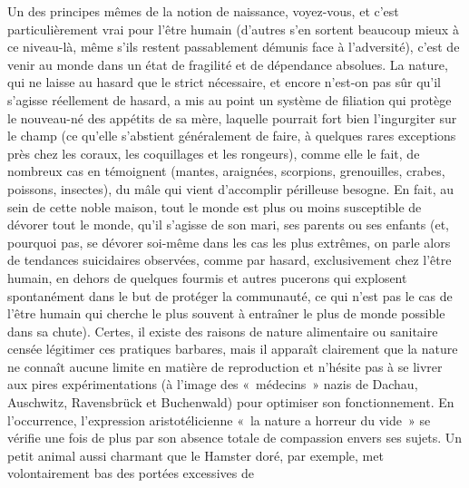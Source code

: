 Un des principes mêmes de la notion de naissance, voyez-vous, et c’est particulièrement vrai pour l’être humain (d’autres s’en sortent beaucoup mieux à ce niveau-là, même s’ils restent passablement démunis face à l’adversité), c’est de venir au monde dans un état de fragilité et de dépendance absolues. La nature, qui ne laisse au hasard que le strict nécessaire, et encore n’est-on pas sûr qu’il s’agisse réellement de hasard, a mis au point un système de filiation qui protège le nouveau-né des appétits de sa mère, laquelle pourrait fort bien l’ingurgiter sur le champ (ce qu’elle s’abstient généralement de faire, à quelques rares exceptions près chez les coraux, les coquillages et les rongeurs), comme elle le fait, de nombreux cas en témoignent (mantes, araignées, scorpions, grenouilles, crabes, poissons, insectes), du mâle qui vient d’accomplir périlleuse besogne. En fait, au sein de cette noble maison, tout le monde est plus ou moins susceptible de dévorer tout le monde, qu’il s’agisse de son mari, ses parents ou ses enfants (et, pourquoi pas, se dévorer soi-même dans les cas les plus extrêmes, on parle alors de tendances suicidaires observées, comme par hasard, exclusivement chez l’être humain, en dehors de quelques fourmis et autres pucerons qui explosent spontanément dans le but de protéger la communauté, ce qui n’est pas le cas de l’être humain qui cherche le plus souvent à entraîner le plus de monde possible dans sa chute). Certes, il existe des raisons de nature alimentaire ou sanitaire censée légitimer ces pratiques barbares, mais il apparaît clairement que la nature ne connaît aucune limite en matière de reproduction et n’hésite pas à se livrer aux pires expérimentations (à l’image des «~médecins~» nazis de Dachau, Auschwitz, Ravensbrück et Buchenwald) pour optimiser son fonctionnement. En l’occurrence, l’expression aristotélicienne «~la nature a horreur du vide~» se vérifie une fois de plus par son absence totale de compassion envers ses sujets. Un petit animal aussi charmant que le Hamster doré, par exemple, met volontairement bas des portées excessives de 